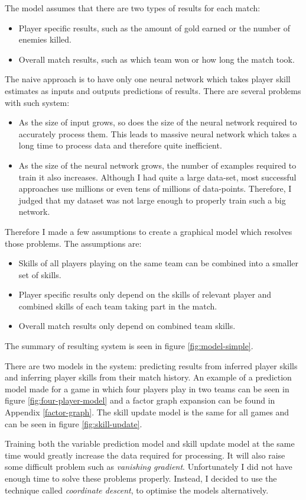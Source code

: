 \documentclass[12pt,a4paper]{book}
\begin{document}
The model assumes that there are two types of results for each match:
\begin{itemize}
\item Player specific results, such as the amount of gold earned or the number of enemies killed.
\item Overall match results, such as which team won or how long the match took.
\end{itemize}
The naive approach is to have only one neural network which takes player skill estimates as inputs and outputs predictions of results.
There are several problems with such system:
\begin{itemize}
\item As the size of input grows, so does the size of the neural network required to accurately process them.
This leads to massive neural network which takes a long time to process data and therefore quite inefficient.
\item As the size of the neural network grows, the number of examples required to train it also increases.
Although I had quite a large data-set, most successful approaches use millions or even tens of millions of data-points.
Therefore, I judged that my dataset was not large enough to properly train such a big network.
\end{itemize}
Therefore I made a few assumptions to create a graphical model which resolves those problems.
The assumptions are:
\begin{itemize}
\item Skills of all players playing on the same team can be combined into a smaller set of skills.
\item Player specific results only depend on the skills of relevant player and combined skills of each team taking part in the match.
\item Overall match results only depend on combined team skills.
\end{itemize}
The summary of resulting system is seen in figure \ref{fig:model-simple}.

There are two models in the system: predicting results from inferred player skills and inferring player skills from their match history.
An example of a prediction model made for a game in which four players play in two teams can be seen in figure \ref{fig:four-player-model} and a factor graph expansion can be found in Appendix \ref{factor-graph}.
The skill update model is the same for all games and can be seen in figure \ref{fig:skill-update}.

Training both the variable prediction model and skill update model at the same time would greatly increase the data required for processing.
It will also raise some difficult problem such as \emph{vanishing gradient}.
Unfortunately I did not have enough time to solve these problems properly.
Instead, I decided to use the technique called \emph{coordinate descent}, to optimise the models alternatively.
\end{document}
